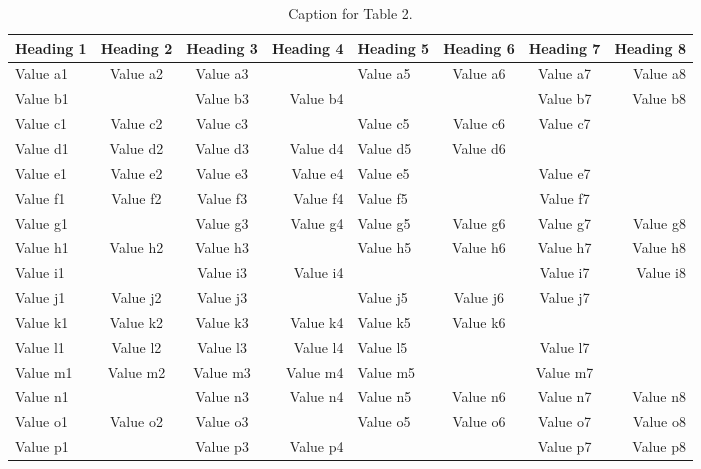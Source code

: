 \documentclass[twocolumn,twoside]{svmultivs_br} %
\begin{document}
%
\begin{table}[htb!]
\caption{Caption for Table 2.}
\begin{center}
\begin{tabular}{|l|c|c|r|l|c|c|r|} \hline
Heading 1 & Heading 2 & Heading 3 & Heading 4 & Heading 5 & Heading 6 & Heading 7 & Heading 8\\
\hline
Value a1 & Value a2 & Value a3 &          & Value a5 & Value a6 & Value a7 & Value a8 \\
Value b1 &          & Value b3 & Value b4 &          &          & Value b7 & Value b8 \\
Value c1 & Value c2 & Value c3 &          & Value c5 & Value c6 & Value c7 &          \\
Value d1 & Value d2 & Value d3 & Value d4 & Value d5 & Value d6 &          &          \\
Value e1 & Value e2 & Value e3 & Value e4 & Value e5 &          & Value e7 &          \\
Value f1 & Value f2 & Value f3 & Value f4 & Value f5 &          & Value f7 &          \\
Value g1 &          & Value g3 & Value g4 & Value g5 & Value g6 & Value g7 & Value g8 \\
\hline
Value h1 & Value h2 & Value h3 &          & Value h5 & Value h6 & Value h7 & Value h8 \\
Value i1 &          & Value i3 & Value i4 &          &          & Value i7 & Value i8 \\
Value j1 & Value j2 & Value j3 &          & Value j5 & Value j6 & Value j7 &          \\
Value k1 & Value k2 & Value k3 & Value k4 & Value k5 & Value k6 &          &          \\
Value l1 & Value l2 & Value l3 & Value l4 & Value l5 &          & Value l7 &          \\
Value m1 & Value m2 & Value m3 & Value m4 & Value m5 &          & Value m7 &          \\
Value n1 &          & Value n3 & Value n4 & Value n5 & Value n6 & Value n7 & Value n8 \\
\hline
Value o1 & Value o2 & Value o3 &          & Value o5 & Value o6 & Value o7 & Value o8 \\
Value p1 &          & Value p3 & Value p4 &          &          & Value p7 & Value p8 \\

\end{tabular}
\end{center}
\end{table}
\end{document}
